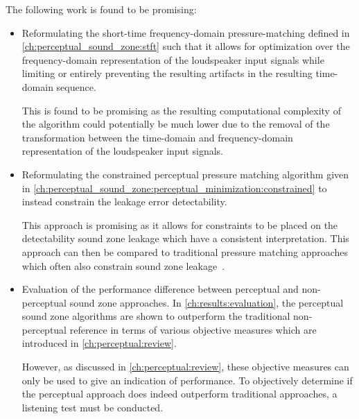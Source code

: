 The following work is found to be promising:
\begin{itemize}
    \item Reformulating the short-time frequency-domain pressure-matching defined in \autoref{ch:perceptual_sound_zone:stft}
        such that it allows for optimization over the frequency-domain representation of the loudspeaker input signals while 
        limiting or entirely preventing the resulting artifacts in the resulting time-domain sequence.

        This is found to be promising as the resulting computational complexity of the algorithm could potentially be much
        lower due to the removal of the transformation between the time-domain and frequency-domain representation of the
        loudspeaker input signals.
    \item Reformulating the constrained perceptual pressure matching algorithm given in \autoref{ch:perceptual_sound_zone:perceptual_minimization:constrained}
        to instead constrain the leakage error detectability.

        This approach is promising as it allows for constraints to be placed on the detectability sound zone leakage which have 
        a consistent interpretation.
        This approach can then be compared to traditional pressure matching approaches which often also constrain sound zone leakage~\cite{betlehem2015personal}.
    \item Evaluation of the performance difference between perceptual and non-perceptual sound zone approaches.
        In \autoref{ch:results:evaluation}, the perceptual sound zone algorithms are shown to outperform the traditional non-perceptual reference in terms of 
        various objective measures which are introduced in \autoref{ch:perceptual:review}.

        However, as discussed in \autoref{ch:perceptual:review}, these objective measures can only be used to give an indication of performance.
        To objectively determine if the perceptual approach does indeed outperform traditional approaches, a listening test must be conducted.
\end{itemize}
